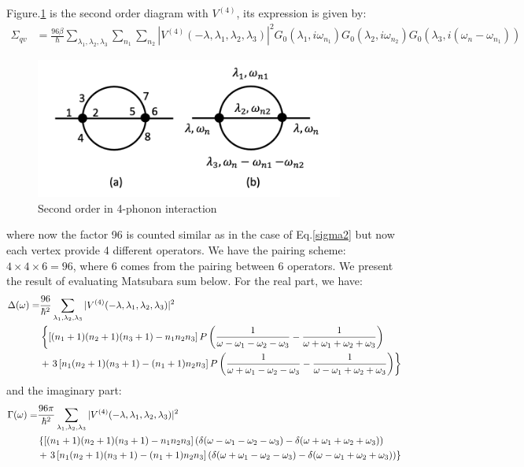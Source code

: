 \documentclass{article}
\begin{document}
\pagebreak
Figure.\ref{diagram3} is the second order diagram with $V^{(4)}$, its expression is given by:
\begin{align}
    \Sigma_{qv} &= \frac{96\beta}{\hbar} \sum_{\lambda_1,\lambda_2,\lambda_3}
                \sum_{n_1}\sum_{n_2} |V^{(4)}(-\lambda,\lambda_1,\lambda_2,\lambda_3)|^2  
            G_0(\lambda_1,i\omega_{n_1})G_0(\lambda_2,i\omega_{n_2})G_0(\lambda_3,i(\omega_n-\omega_{n_1}))  \label{sigma3}
\end{align}
\begin{figure}[h!]
    \centering
    \includegraphics[width=4in]{img/self.energy.3.png}
    \caption{Second order in 4-phonon interaction}
    \label{diagram3}
\end{figure}
where now the factor 96 is counted similar as in the case of Eq.\ref{sigma2} but now each vertex provide 4 different operators. We have 
the pairing scheme: $4\times 4\times 6 = 96$, where 6 comes from the pairing between 6 operators.
We present the result of evaluating Matsubara sum below. For the real part, we have:
\begin{align}
    \Delta(\omega) = & \frac{96}{\hbar^2} \sum_{\lambda_1,\lambda_2,\lambda_3}  |V^{(4)}(-\lambda,\lambda_1,\lambda_2,\lambda_3)|^2  \notag \\
            & \left\{ \left[ (n_1+1)(n_2+1)(n_3+1) - n_1n_2n_3 \right] P\left(\frac{1}{\omega-\omega_1-\omega_2-\omega_3} - \frac{1}{\omega+\omega_1+\omega_2+\omega_3}\right) \right. \notag \\
            &+ \left. 3 \left[ n_1(n_2+1)(n_3+1) - (n_1+1)n_2n_3 \right] P\left(\frac{1}{\omega+\omega_1-\omega_2-\omega_3} - \frac{1}{\omega-\omega_1+\omega_2+\omega_3}\right) \right\}  
\end{align}
and the imaginary part:
\begin{align}
    \Gamma(\omega) = & \frac{96\pi}{\hbar^2} \sum_{\lambda_1,\lambda_2,\lambda_3}  |V^{(4)}(-\lambda,\lambda_1,\lambda_2,\lambda_3)|^2  \notag \\
            & \left\{ \left[ (n_1+1)(n_2+1)(n_3+1) - n_1n_2n_3 \right] \left(\delta(\omega-\omega_1-\omega_2-\omega_3) - \delta(\omega+\omega_1+\omega_2+\omega_3) \right) \right.  \notag \\
            &+ \left. 3 \left[ n_1(n_2+1)(n_3+1) - (n_1+1)n_2n_3 \right] \left(\delta(\omega+\omega_1-\omega_2-\omega_3) - \delta(\omega-\omega_1+\omega_2+\omega_3) \right)  \right\}  
\end{align}
\end{document}
